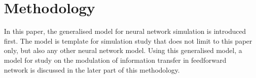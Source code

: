 \chapter{Methodology}
In this paper, the generalised model for neural network simulation is introduced first.  The model is template for simulation study that does not limit to this paper only, but also any other neural network model. Using this generalised model, a model for study on the modulation of information transfer in feedforward network is discussed in the later part of this methodology. 
